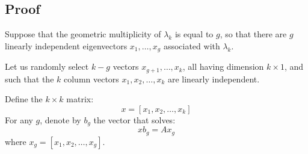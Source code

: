 \documentclass{article}
\begin{document}
\subsection{Proof}
Suppose that the geometric multiplicity of \( \lambda_k \) is equal to \( g \), so that there are \( g \) linearly independent eigenvectors \( x_1, \dots, x_g \) associated with \( \lambda_k \).

Let us randomly select \( k - g \) vectors \( x_{g+1}, \dots, x_k \), all having dimension \( k \times 1 \), and such that the \( k \) column vectors \( x_1, x_2, \dots, x_k \) are linearly independent.

Define the \( k \times k \) matrix:
\[
x = [x_1, x_2, \dots, x_k]
\]
For any \( g \), denote by \( b_g \) the vector that solves:
\[
x b_g = A x_g
\]
where \( x_g = [x_1, x_2, \dots, x_g] \).
\end{document}
